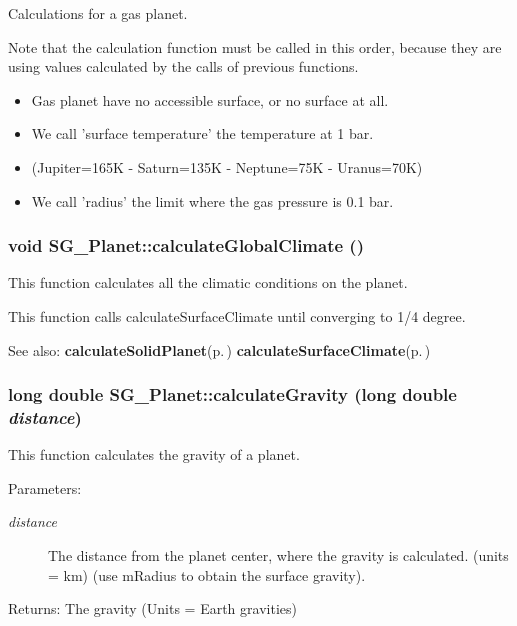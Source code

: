 Calculations for a gas planet. 

Note that the calculation function must be called in this order, because they are using values calculated by the calls of previous functions.\begin{itemize}
\item Gas planet have no accessible surface, or no surface at all.\item We call 'surface temperature' the temperature at 1 bar.\item (Jupiter=165K - Saturn=135K - Neptune=75K - Uranus=70K)\item We call 'radius' the limit where the gas pressure is 0.1 bar. \end{itemize}
\subsubsection{\setlength{\rightskip}{0pt plus 5cm}void SG\_\-Planet::calculate\-Global\-Climate ()\hspace{0.3cm}{\tt  [protected]}}\label{class_s_g___planet_b13}


This function calculates all the climatic conditions on the planet. 

This function calls calculate\-Surface\-Climate until converging to 1/4 degree. \begin{Desc}
\item[See also:]{\bf calculate\-Solid\-Planet}{\rm (p.\,\pageref{class_s_g___planet_b1})} {\bf calculate\-Surface\-Climate}{\rm (p.\,\pageref{class_s_g___planet_b24})} \end{Desc}
\subsubsection{\setlength{\rightskip}{0pt plus 5cm}long double SG\_\-Planet::calculate\-Gravity (long double {\em distance})\hspace{0.3cm}{\tt  [protected]}}\label{class_s_g___planet_b9}


This function calculates the gravity of a planet. 

\begin{Desc}
\item[Parameters:]
\begin{description}
\item[{\em distance}]The distance from the planet center, where the gravity is calculated. (units = km) (use m\-Radius to obtain the surface gravity). \end{description}
\end{Desc}
\begin{Desc}
\item[Returns:]The gravity (Units = Earth gravities)\end{Desc}


